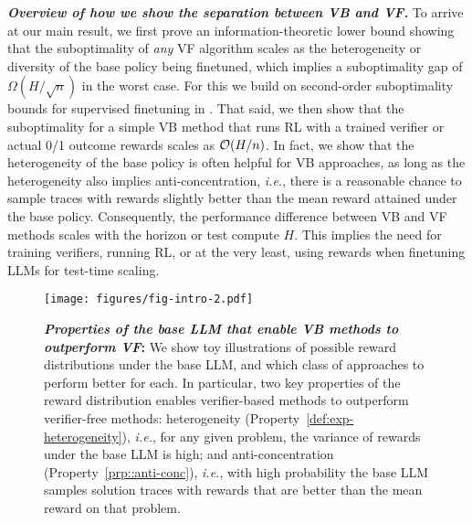 \emph{\textbf{Overview of how we show the separation between VB and VF.}} To arrive at our main result,  we first prove an information-theoretic lower bound showing that the suboptimality of \emph{any} VF algorithm scales as the heterogeneity or diversity of the base policy being finetuned, which implies a suboptimality gap of $\Omega(H/\sqrt{n})$ in the worst case. For this we build on second-order suboptimality bounds for supervised finetuning in \citet{foster2024behavior}. 
That said, we then show that the suboptimality for a simple VB method that runs RL with a trained verifier or actual 0/1 outcome rewards scales as ${\mathcal{O}}(H/n)$. 
In fact, we show that the heterogeneity of the base policy is often helpful for VB approaches, as long as the heterogeneity also implies anti-concentration, \textit{i.e.}, there is a reasonable chance to sample traces with rewards slightly better than the mean reward attained under the base policy. Consequently, the performance difference between VB and VF methods scales with the horizon or test compute $H$. This 
implies the need for training verifiers, running RL, or at the very least, using rewards when finetuning LLMs for test-time scaling. 

\begin{figure}
        \centering
    \texttt{[image: figures/fig-intro-2.pdf]}
    \caption{\footnotesize{\textbf{\emph{Properties of the base LLM that enable VB methods to outperform VF}:} We show toy illustrations of possible reward distributions under the base LLM, and which class of approaches to perform better for each. In particular, two key properties of the reward distribution  enables verifier-based methods to outperform verifier-free methods: heterogeneity (Property~\ref{def:exp-heterogeneity}), \textit{i.e.}, for any given problem, the variance of rewards under the base LLM is high;  and anti-concentration (Property~\ref{prp::anti-conc}), \textit{i.e.}, with high probability the base LLM samples solution traces with rewards that are better than the mean reward on that problem.}} 
    \label{fig:dist-sketch}
\end{figure}

